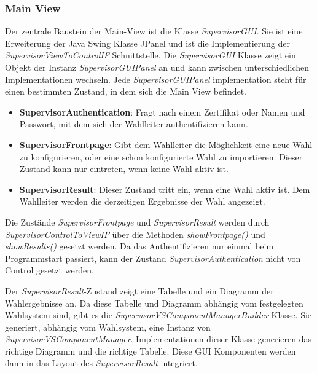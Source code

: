\documentclass[parskip=full]{scrartcl}
\newcommand{\textitx}[1]{\mbox{\textit{#1}}}
\newcommand{\fakeparagraph}[1]{\textbf{#1}}
\begin{document}
		\subsubsection{Main View}
		Der zentrale Baustein der Main-View ist die Klasse \textitx{SupervisorGUI}. Sie ist eine Erweiterung der Java Swing Klasse JPanel und ist die Implementierung der \textit{SupervisorViewToControlIF} Schnittstelle. Die \textitx{SupervisorGUI} Klasse zeigt ein Objekt der Instanz \textitx{SupervisorGUIPanel} an und kann zwischen unterschiedlichen Implementationen wechseln. Jede \textitx{SupervisorGUIPanel} implementation steht für einen bestimmten Zustand, in dem sich die Main View befindet.
		\begin{itemize}
			\item\fakeparagraph{SupervisorAuthentication}: Fragt nach einem Zertifikat oder Namen und Passwort, mit dem sich der Wahlleiter authentifizieren kann.
			\item\fakeparagraph{SupervisorFrontpage}: Gibt dem Wahlleiter die Möglichkeit eine neue Wahl zu konfigurieren, oder eine schon konfigurierte Wahl zu importieren. Dieser Zustand kann nur eintreten, wenn keine Wahl aktiv ist.
			\item\fakeparagraph{SupervisorResult}: Dieser Zustand tritt ein, wenn eine Wahl aktiv ist. Dem Wahlleiter werden die derzeitigen Ergebnisse der Wahl angezeigt.
		\end{itemize}
	
		Die Zustände \textitx{SupervisorFrontpage} und \textitx{SupervisorResult} werden durch \textit{SupervisorControlToViewIF} über die Methoden \textitx{showFrontpage()} und \textitx{showResults()} gesetzt werden. Da das Authentifizieren nur einmal beim Programmstart passiert, kann der Zustand \textit{SupervisorAuthentication} nicht von Control gesetzt werden.
		
		Der \textitx{SupervisorResult}-Zustand zeigt eine Tabelle und ein Diagramm der Wahlergebnisse an. Da diese Tabelle und Diagramm abhängig vom festgelegten Wahlsystem sind, gibt es die \textit{SupervisorVSComponentManagerBuilder} Klasse. Sie generiert, abhängig vom Wahlsystem, eine Instanz von \textit{SupervisorVSComponentManager}. Implementationen dieser Klasse generieren das richtige Diagramm und die richtige Tabelle. Diese GUI Komponenten werden dann in das Layout des \textitx{SupervisorResult} integriert.
		
\end{document}
